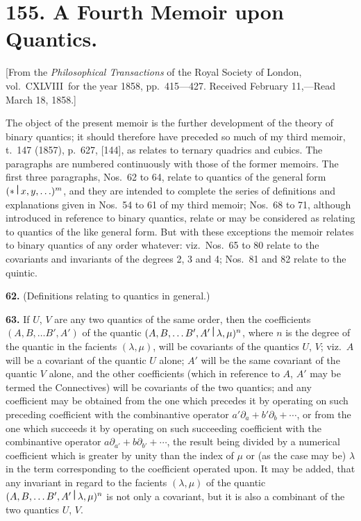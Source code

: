 \documentclass[12pt,a4paper]{article}
\theoremstyle{definition}
\begin{document}
\newpage

\section*{155. A Fourth Memoir upon Quantics.}

[From the \textit{Philosophical Transactions} of the Royal Society of London, vol.~CXLVIII\ for the year 1858, pp.~415---427.
Received February 11,---Read March 18, 1858.]

\bigskip

The object of the present memoir is the further development of the theory of binary quantics; it should therefore have preceded so much of my third memoir, t.~147 (1857), p.~627, [144], as relates to ternary quadrics and cubics. The paragraphs are numbered continuously with those of the former memoirs. The first three paragraphs, Nos.~62 to 64, relate to quantics of the general form $(*\,\raisebox{0.5ex}{\textbf{\textbar}}\,x,y,\ldots)^m$, and they are intended to complete the series of definitions and explanations given in Nos.~54 to 61 of my third memoir; Nos.~68 to 71, although introduced in reference to binary quantics, relate or may be considered as relating to quantics of the like general form. But with these exceptions the memoir relates to binary quantics of any order whatever: viz.\ Nos.~65 to 80 relate to the covariants and invariants of the degrees 2, 3 and 4; Nos.~81 and 82 relate to the quintic.

\medskip
\noindent\textbf{62.} (Definitions relating to quantics in general.)

\medskip
\noindent\textbf{63.} If $U$, $V$ are any two quantics of the same order, then the coefficients $(A,B,\ldots B',A')$ of the quantic $(A,B,\ldots B',A'\,\raisebox{0.5ex}{\textbf{\textbar}}\,\lambda,\mu)^n$, where $n$ is the degree of the quantic in the facients $(\lambda,\mu)$, will be covariants of the quantics $U$, $V$; viz.\ $A$ will be a covariant of the quantic $U$ alone; $A'$ will be the same covariant of the quantic $V$ alone, and the other coefficients (which in reference to $A$, $A'$ may be termed the Connectives) will be covariants of the two quantics; and any coefficient may be obtained from the one which precedes it by operating on such preceding coefficient with the combinantive operator $a'\partial_a + b'\partial_b + \cdots$, or from the one which succeeds it by operating on such succeeding coefficient with the combinantive operator $a\partial_{a'} + b\partial_{b'} + \cdots$, the result being divided by a numerical coefficient which is greater by unity than the index of $\mu$ or (as the case may be) $\lambda$ in the term corresponding to the coefficient operated upon. It may be added, that any invariant in regard to the facients $(\lambda,\mu)$ of the quantic $(A,B,\ldots B',A'\,\raisebox{0.5ex}{\textbf{\textbar}}\,\lambda,\mu)^n$ is not only a covariant, but it is also a combinant of the two quantics $U$, $V$.
\end{document}
